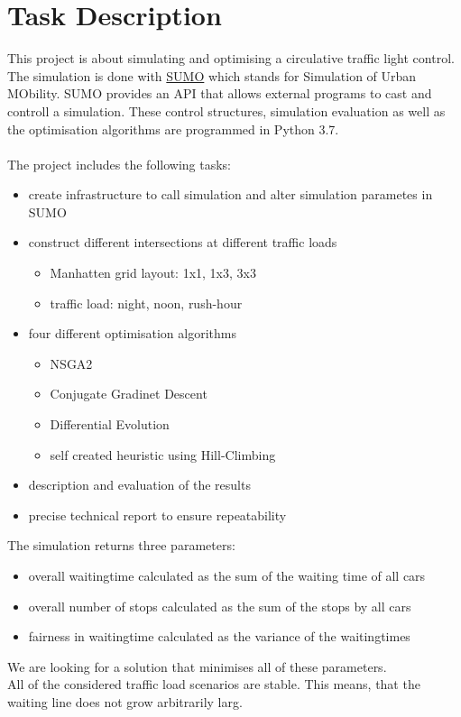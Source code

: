 \documentclass[./\jobname.tex]{subfiles}
\begin{document}
\chapter{Task Description}

This project is about simulating and optimising a circulative traffic light control. The simulation is done with  \href{https://www.dlr.de/ts/en/desktopdefault.aspx/tabid-9883/16931_read-41000/}{SUMO} which stands for Simulation of Urban MObility. SUMO provides an API that allows external programs to cast and controll a simulation. These control structures, simulation evaluation as well as the optimisation algorithms are programmed in Python 3.7. \\~\\
The project includes the following tasks: 
\begin{itemize}
	\item create infrastructure to call simulation and alter simulation parametes in SUMO
	\item construct different intersections at different traffic loads
	\begin{itemize}
		\item Manhatten grid layout: 1x1, 1x3, 3x3
		\item traffic load: night, noon, rush-hour
	\end{itemize}
	\item four different optimisation algorithms
	\begin{itemize}
		\item NSGA2
		\item Conjugate Gradinet Descent
		\item Differential Evolution
		\item self created heuristic using Hill-Climbing
	\end{itemize}
	\item description and evaluation of the results
	\item precise technical report to ensure repeatability 
\end{itemize}

The simulation returns three parameters: 
\begin{itemize}
	\item overall waitingtime calculated as the sum of the waiting time of all cars
	\item overall number of stops calculated as the sum of the stops by all cars
	\item fairness in waitingtime calculated as the variance of the waitingtimes \\
\end{itemize}
We are looking for a solution that minimises all of these parameters. \\
All of the considered traffic load scenarios are stable. This means, that the waiting line does not grow arbitrarily larg. 
\end{document}
